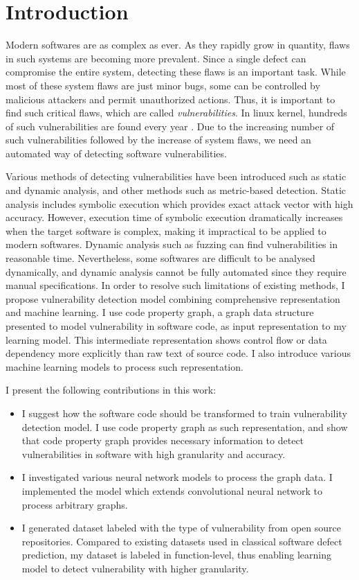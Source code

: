 \section{Introduction}
\label{section:introduction}

Modern softwares are as complex as ever. As they rapidly grow in quantity, flaws in such systems are becoming more prevalent.
Since a single defect can compromise the entire system, detecting these flaws is an important task.
While most of these system flaws are just minor bugs, some can be controlled by malicious attackers and permit unauthorized actions.
Thus, it is important to find such critical flaws, which are called \textit{vulnerabilities}.
In linux kernel, hundreds of such vulnerabilities are found every year \cite{cvelinux}.
Due to the increasing number of such vulnerabilities followed by the increase of system flaws, we need an automated way of detecting software vulnerabilities.

Various methods of detecting vulnerabilities have been introduced such as static and dynamic analysis, and other methods such as metric-based detection.
Static analysis includes symbolic execution which provides exact attack vector with high accuracy.
However, execution time of symbolic execution dramatically increases when the target software is complex, making it impractical to be applied to modern softwares.
Dynamic analysis such as fuzzing can find vulnerabilities in reasonable time.
Nevertheless, some softwares are difficult to be analysed dynamically, and dynamic analysis cannot be fully automated since they require manual specifications.
In order to resolve such limitations of existing methods, I propose vulnerability detection model combining comprehensive representation and machine learning.
I use code property graph, a graph data structure presented to model vulnerability in software code, as input representation to my learning model.
This intermediate representation shows control flow or data dependency more explicitly than raw text of source code.
I also introduce various machine learning models to process such representation.

I present the following contributions in this work:
\begin{itemize}
\item
I suggest how the software code should be transformed to train vulnerability detection model.
I use code property graph as such representation, and show that code property graph provides necessary information to detect vulnerabilities in software with high granularity and accuracy.
\item
I investigated various neural network models to process the graph data.
I implemented the model which extends convolutional neural network to process arbitrary graphs.
\item
I generated dataset labeled with the type of vulnerability from open source repositories.
Compared to existing datasets used in classical software defect prediction, my dataset is labeled in function-level,
thus enabling learning model to detect vulnerability with higher granularity.
\end{itemize}


